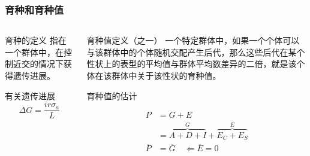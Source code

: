\documentclass[serif,aspectratio=169]{beamer}
\begin{document}
\begin{frame}
  \frametitle{育种和育种值}
  \begin{columns}
    \begin{column}{.5\textwidth}
      \begin{block}{育种的定义}
        \hspace{2em}指在一个群体中，在控制{\color{cyan}近交}的情况下获得{\color{cyan}遗传进展}。
      \end{block}
      \begin{block}{有关遗传进展}
        $$\Delta G = \frac{ir\sigma_a}{L}$$
      \end{block}
    \end{column}
    \pause
    \begin{column}{.5\textwidth}
      \begin{block}{育种值定义（之一）}
        \hspace{2em}一个特定群体中，如果一个个体可以与该群体中的个体随机交配产生后代，那么这些{\color{cyan}后代}在某个性状上的表型的{\color{cyan}平均值}与群体平均数{\color{cyan}差异的二倍}，就是{\color{cyan}该个体}在{\color{cyan}该群体}中关于{\color{cyan}该性状}的育种值。
      \end{block}
      \pause
      
      \begin{block}{育种值的估计}

        \vspace{-6ex}
        
        \begin{align*}
          P&=G+E\\
          &=\overbrace{A+D+I}^G+\overbrace{E_C+E_S}^E\\
          \overline{P}&=\overline{G}\quad\Leftarrow\overline{E}=0
        \end{align*}
      \end{block}
    \end{column}
  \end{columns}
\end{frame}
\end{document}
